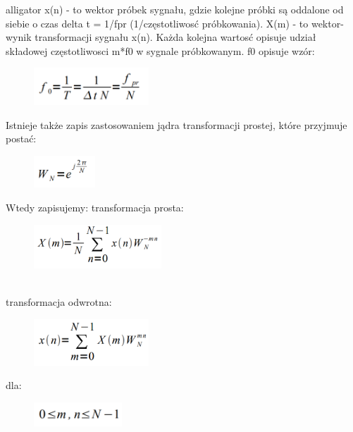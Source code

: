 \documentclass[12pt]{article}
\begin{document}
\begin{labeling}{alligator}
x(n) - to wektor próbek sygnału, gdzie kolejne próbki są oddalone od  siebie o czas delta t = 1/fpr (1/częstotliwosć próbkowania).
X(m) -  to wektor-wynik transformacji sygnału x(n). Każda kolejna wartosć opisuje udział składowej częstotliwosci m*f0 w sygnale próbkowanym.
f0 opisuje wzór:
 \\
\begin{figure}[h!]
 \centering
 \includegraphics[width=4.3cm]{f0.PNG}
 \vspace{-0.3cm}
 \label{Widok_aplikacjis}
\end{figure}
Istnieje także zapis zastosowaniem jądra transformacji prostej, które przyjmuje postać:
\begin{figure}[h!]
 \centering
 \includegraphics[width=2.3cm]{jadroW.PNG}
 \vspace{-0.3cm}
 \label{Splot_indeks}
\end{figure}
Wtedy zapisujemy:
\newpage
transformacja prosta:
\begin{figure}[h!]
 \centering
 \includegraphics[width=4.8cm]{Xm.PNG}
 \vspace{-0.3cm}
 \label{Splot_indeks}
\end{figure}
\\ transformacja odwrotna:
\begin{figure}[h!]
 \centering
 \includegraphics[width=4.3cm]{xn.PNG}
 \vspace{-0.3cm}
 \label{Splot_indeks}
\end{figure}
dla:
\begin{figure}[h!]
 \centering
 \includegraphics[width=3.3cm]{m,n.PNG}
 \vspace{-0.3cm}
 \label{Splot_indeks}
\end{figure}


\end{labeling}
\end{document}
